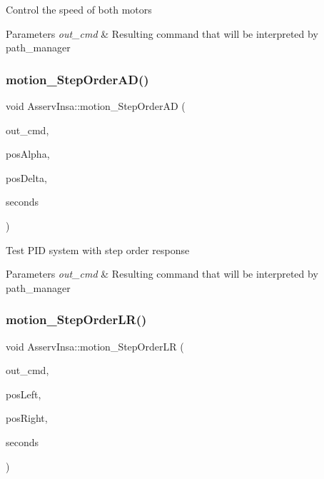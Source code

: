 Control the speed of both motors 
\begin{DoxyParams}{Parameters}
{\em out\+\_\+cmd} & Resulting command that will be interpreted by path\+\_\+manager \\
\hline
\end{DoxyParams}
\mbox{\label{classAsservInsa_ab9a32335b1fe9484243f5849680fe510}} 
\subsubsection{\texorpdfstring{motion\+\_\+\+Step\+Order\+A\+D()}{motion\_StepOrderAD()}}
{\footnotesize\ttfamily void Asserv\+Insa\+::motion\+\_\+\+Step\+Order\+AD (\begin{DoxyParamCaption}\item[{\hyperlink{structRobotCommand}{Robot\+Command} $\ast$}]{out\+\_\+cmd,  }\item[{int32}]{pos\+Alpha,  }\item[{int32}]{pos\+Delta,  }\item[{int}]{seconds }\end{DoxyParamCaption})}

Test P\+ID system with step order response 
\begin{DoxyParams}{Parameters}
{\em out\+\_\+cmd} & Resulting command that will be interpreted by path\+\_\+manager \\
\hline
\end{DoxyParams}
\mbox{\label{classAsservInsa_a8237e3dcb0d9c8852f692c466da10f32}} 
\subsubsection{\texorpdfstring{motion\+\_\+\+Step\+Order\+L\+R()}{motion\_StepOrderLR()}}
{\footnotesize\ttfamily void Asserv\+Insa\+::motion\+\_\+\+Step\+Order\+LR (\begin{DoxyParamCaption}\item[{\hyperlink{structRobotCommand}{Robot\+Command} $\ast$}]{out\+\_\+cmd,  }\item[{int32}]{pos\+Left,  }\item[{int32}]{pos\+Right,  }\item[{int}]{seconds }\end{DoxyParamCaption})}

